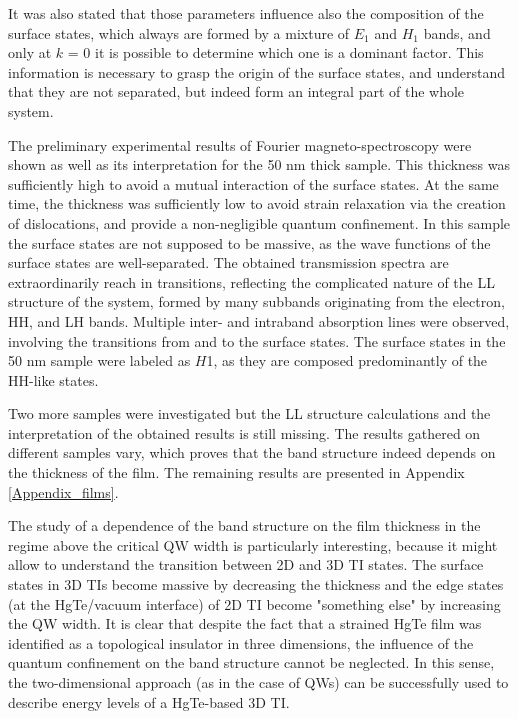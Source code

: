 \documentclass[titlepage,a4paper]{book}
\begin{document}
It was also stated that those parameters influence also the composition of the surface states, which always are formed by a mixture of $E_1$ and $H_1$ bands, and only at $k$ = 0 it is possible to determine which one is a dominant factor. This information is necessary to grasp the origin of the surface states, and understand that they are not separated, but indeed form an integral part of the whole system.

The preliminary experimental results of Fourier magneto-spectroscopy were shown as well as its interpretation for the 50 nm thick sample. This thickness was sufficiently high to avoid a mutual interaction of the surface states. At the same time, the thickness was sufficiently low to avoid strain relaxation via the creation of dislocations, and provide a non-negligible quantum confinement. In this sample the surface states are not supposed to be massive, as the wave functions of the surface states are well-separated. The obtained transmission spectra are extraordinarily reach in transitions, reflecting the complicated nature of the LL structure of the system, formed by many subbands originating from the electron, HH, and LH bands. Multiple inter- and intraband absorption lines were observed, involving the transitions from and to the surface states. The surface states in the 50 nm sample were labeled as $H$1, as they are composed predominantly of the HH-like states.

Two more samples were investigated but the LL structure calculations and the interpretation of the obtained results is still missing. The results gathered on different samples vary, which proves that the band structure indeed depends on the thickness of the film. The remaining results are presented in Appendix \ref{Appendix_films}. 

The study of a dependence of the band structure on the film thickness in the regime above the critical QW width is particularly interesting, because it might allow to understand the transition between 2D and 3D TI states. The surface states in 3D TIs become massive by decreasing the thickness and the edge states (at the HgTe/vacuum interface) of 2D TI become "something else" by increasing the QW width. It is clear that despite the fact that a strained HgTe film was identified as a topological insulator in three dimensions, the influence of the quantum confinement on the band structure cannot be neglected. In this sense, the two-dimensional approach (as in the case of QWs) can be successfully used to describe energy levels of a HgTe-based 3D TI. 
\end{document}
